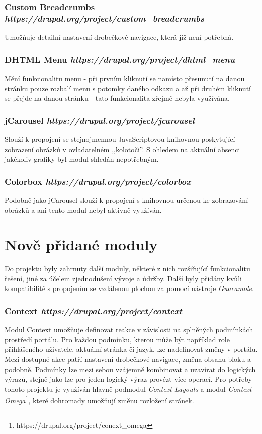 \subsubsection*{\textbf{Custom Breadcrumbs} \hfill \emph{https://drupal.org/project/custom\_breadcrumbs}}
Umožňuje detailní nastavení drobečkové navigace, která již není potřebná.

\subsubsection*{\textbf{DHTML Menu} \hfill \emph{https://drupal.org/project/dhtml\_menu}}
Mění funkcionalitu menu - při prvním kliknutí se namísto přesunutí na danou stránku pouze rozbalí menu s potomky daného odkazu a až při druhém kliknutí se přejde na danou stránku - tato funkcionalita zřejmě nebyla využívána.

\subsubsection*{\textbf{jCarousel} \hfill \emph{https://drupal.org/project/jcarousel}}
Slouží k propojení se stejnojmennou JavaScriptovou knihovnou poskytující zobrazení obrázků v ovladatelném ,,kolotoči''. S ohledem na aktuální absenci jakékoliv grafiky byl modul shledán nepotřebným.
 
\subsubsection*{\textbf{Colorbox} \hfill \emph{https://drupal.org/project/colorbox}}
Podobně jako jCarousel slouží k propojení s knihovnou určenou ke zobrazování obrázků a ani tento modul nebyl aktivně využíván.

\section{Nově přidané moduly}
\label{sec:nove-moduly}
Do projektu byly zahrnuty další moduly, některé z nich rozšiřující funkcionalitu řešení, jiné za účelem zjednodušení vývoje a údržby. Další byly přidány kvůli kompatibilitě s propojením se vzdálenou plochou za pomocí nástroje \emph{Guacamole}.

\subsubsection*{\textbf{Context} \hfill \emph{https://drupal.org/project/context}} 
\label{subsec:context}
Modul Context umožňuje definovat reakce v závislosti na splněných podmínkách prostředí portálu. Pro každou podmínku, kterou může být například role přihlášeného uživatele, aktuální stránka či jazyk, lze nadefinovat změny v portálu. Mezi dostupné akce patří nastavení drobečkové navigace, změna obsahu bloku a podobně. Podmínky lze mezi sebou vzájemně kombinovat a uzavírat do logických výrazů, stejně jako lze pro jeden logický výraz provézt více operací. Pro potřeby tohoto projektu je využíván hlavně podmodul \emph{Context Layouts} a modul \emph{Context Omega}\footnote{https://drupal.org/project/conext\_omega}, které dohromady umožňují změnu rozložení stránek.

